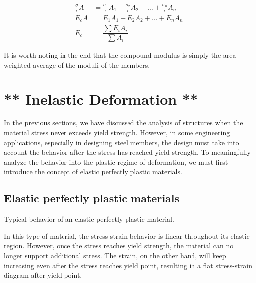 \documentclass[
fontsize=10pt,
a4paper,
twosides=false,
open=any,
svgnames,
]{kaobook} %
\begin{document}
\begin{align}
  \label{eq: compound modulus}
  \frac{\sigma}{\epsilon} A &= \frac{\sigma_1}{\epsilon} A_1 + \frac{\sigma_2}{\epsilon} A_2 + \ldots + \frac{\sigma_n}{\epsilon} A_n \nonumber \\
  E_cA &= E_1 A_1 + E_2A_2 + \ldots + E_nA_n \nonumber \\
  E_c &= \dfrac{\sum E_iA_i}{\sum A_i}
\end{align}

It is worth noting in the end that the compound modulus is simply the area-weighted average of the moduli of the members.

\section{** Inelastic Deformation **}

In the previous sections, we have discussed the analysis of structures when the material stress never exceeds yield strength. However, in some engineering applications, especially in designing steel members, the design must take into account the behavior after the stress has reached yield strength. To meaningfully analyze the behavior into the plastic regime of deformation, we must first introduce the concept of elastic perfectly plastic materials.

\subsection{Elastic perfectly plastic materials}

\begin{marginfigure}
  \centering
  \caption{Typical behavior of an elastic-perfectly plastic material.}
\end{marginfigure}

In this type of material, the stress-strain behavior is linear throughout its elastic region. However, once the stress reaches yield strength, the material can no longer support additional stress. The strain, on the other hand, will keep increasing even after the stress reaches yield point, resulting in a flat stress-strain diagram after yield point.
\end{document}
